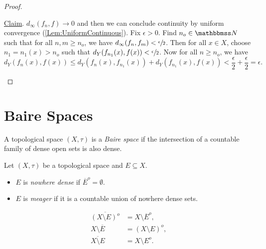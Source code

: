 \documentclass[screen,single]{techreport}
\numberwithin{equation}{section}
\begin{document}
\begin{proof}
\begin{itemize}
    \underline{Claim}. $d_\infty(f_n,f) \rightarrow 0$ and then we can conclude continuity by uniform convergence (\cref{Lem:UniformContinuous}).
    Fix $\epsilon > 0$.
    Find $n_o \in \bbN$ such that for all $n,m \ge n_o$, we have $d_\infty(f_n,f_m) < \sfrac{\epsilon}{2}$.
    Then for all $x \in X$, choose $n_1 = n_1(x) > n_o$ such that $d_Y(f_{n_1}(x),f(x)) < \sfrac{\epsilon}{2}$.
    Now for all $n \ge n_o$, we have
    \[
    d_Y(f_n(x), f(x)) \le d_Y(f_n(x),f_{n_1}(x)) + d_Y(f_{n_1}(x), f(x)) < \frac{\epsilon}{2} +\frac{\epsilon}{2} = \epsilon.
    \]
  \end{itemize}
\end{proof}

\section{Baire Spaces}

\begin{definition}\label{De:BaireSpace}
  A topological space $(X,\tau)$ is a \emph{Baire space} if the intersection of a countable family of dense open sets is also dense.
\end{definition}

\begin{definition}\label{De:NowhereDenseAndMeager}
  Let $(X,\tau)$ be a topological space and $E \subseteq X$.
  \begin{itemize}
    \item $E$ is \emph{nowhere dense} if $\overline{E}^o = \emptyset$.
    \item $E$ is \emph{meager} if it is a countable union of nowhere dense sets.
  \end{itemize}
\end{definition}

\begin{remark}\label{Rem:SeveralClosIntEqulities}
  \begin{align*}
    \overline{(X \setminus E)^o} & = X \setminus \overline{E}^o, \\
    X \setminus \overline{E} & = (X \setminus E)^o, \\
    \overline{X \setminus E} & = X \setminus E^o.
  \end{align*}
\end{remark}
\end{document}
